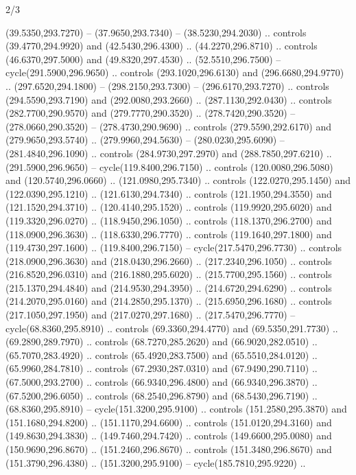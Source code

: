 \begin{flagdescription}{2/3}
\begin{scope}[xshift=0.5\flaglength,yshift=0.5\flagwidth,scale=\stretchfactor]
\begin{scope}[scale=0.001645\flagwidth,yshift=65mm,xshift=-63mm]
\begin{scope}[y=0.80pt, x=0.80pt, yscale=-1,]
\begin{scope}[cm={{1.33333,0.0,0.0,1.33333,(0.0,1e-05)}}]
  (39.5350,293.7270) -- (37.9650,293.7340) -- (38.5230,294.2030) .. controls
  (39.4770,294.9920) and (42.5430,296.4300) .. (44.2270,296.8710) .. controls
  (46.6370,297.5000) and (49.8320,297.4530) .. (52.5510,296.7500) --
  cycle(291.5900,296.9650) .. controls (293.1020,296.6130) and
  (296.6680,294.9770) .. (297.6520,294.1800) -- (298.2150,293.7300) --
  (296.6170,293.7270) .. controls (294.5590,293.7190) and (292.0080,293.2660) ..
  (287.1130,292.0430) .. controls (282.7700,290.9570) and (279.7770,290.3520) ..
  (278.7420,290.3520) -- (278.0660,290.3520) -- (278.4730,290.9690) .. controls
  (279.5590,292.6170) and (279.9650,293.5740) .. (279.9960,294.5630) --
  (280.0230,295.6090) -- (281.4840,296.1090) .. controls (284.9730,297.2970) and
  (288.7850,297.6210) .. (291.5900,296.9650) -- cycle(119.8400,296.7150) ..
  controls (120.0080,296.5080) and (120.5740,296.0660) .. (121.0980,295.7340) ..
  controls (122.0270,295.1450) and (122.0390,295.1210) .. (121.6130,294.7340) ..
  controls (121.1950,294.3550) and (121.1520,294.3710) .. (120.4140,295.1520) ..
  controls (119.9920,295.6020) and (119.3320,296.0270) .. (118.9450,296.1050) ..
  controls (118.1370,296.2700) and (118.0900,296.3630) .. (118.6330,296.7770) ..
  controls (119.1640,297.1800) and (119.4730,297.1600) .. (119.8400,296.7150) --
  cycle(217.5470,296.7730) .. controls (218.0900,296.3630) and
  (218.0430,296.2660) .. (217.2340,296.1050) .. controls (216.8520,296.0310) and
  (216.1880,295.6020) .. (215.7700,295.1560) .. controls (215.1370,294.4840) and
  (214.9530,294.3950) .. (214.6720,294.6290) .. controls (214.2070,295.0160) and
  (214.2850,295.1370) .. (215.6950,296.1680) .. controls (217.1050,297.1950) and
  (217.0270,297.1680) .. (217.5470,296.7770) -- cycle(68.8360,295.8910) ..
  controls (69.3360,294.4770) and (69.5350,291.7730) .. (69.2890,289.7970) ..
  controls (68.7270,285.2620) and (66.9020,282.0510) .. (65.7070,283.4920) ..
  controls (65.4920,283.7500) and (65.5510,284.0120) .. (65.9960,284.7810) ..
  controls (67.2930,287.0310) and (67.9490,290.7110) .. (67.5000,293.2700) ..
  controls (66.9340,296.4800) and (66.9340,296.3870) .. (67.5200,296.6050) ..
  controls (68.2540,296.8790) and (68.5430,296.7190) .. (68.8360,295.8910) --
  cycle(151.3200,295.9100) .. controls (151.2580,295.3870) and
  (151.1680,294.8200) .. (151.1170,294.6600) .. controls (151.0120,294.3160) and
  (149.8630,294.3830) .. (149.7460,294.7420) .. controls (149.6600,295.0080) and
  (150.9690,296.8670) .. (151.2460,296.8670) .. controls (151.3480,296.8670) and
  (151.3790,296.4380) .. (151.3200,295.9100) -- cycle(185.7810,295.9220) ..

\end{scope}
\end{scope}
\end{scope}
\end{scope}
\end{flagdescription}
